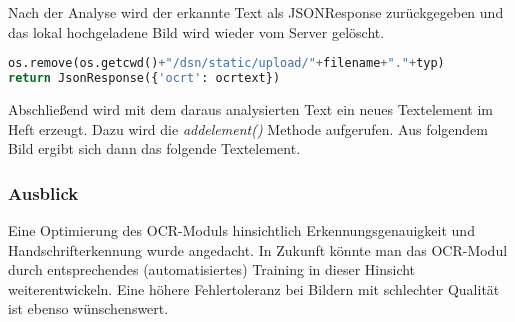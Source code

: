 Nach der Analyse wird der erkannte Text als JSONResponse zurückgegeben und das lokal hochgeladene Bild wird wieder vom Server gelöscht.

\begin{lstlisting}[caption={Fileentfernung und Rückgabe des OCR-Textes}, language=Python]
os.remove(os.getcwd()+"/dsn/static/upload/"+filename+"."+typ)
return JsonResponse({'ocrt': ocrtext})
\end{lstlisting}

Abschließend wird mit dem daraus analysierten Text ein neues Textelement im Heft erzeugt. Dazu wird die \textit{addelement()} Methode aufgerufen. Aus folgendem Bild ergibt sich dann das folgende Textelement.



\subsubsection{Ausblick}
Eine Optimierung des OCR-Moduls hinsichtlich Erkennungsgenauigkeit und Handschrifterkennung wurde angedacht. In Zukunft könnte man das OCR-Modul durch entsprechendes (automatisiertes) Training in dieser Hinsicht weiterentwickeln. Eine höhere Fehlertoleranz bei Bildern mit schlechter Qualität ist ebenso wünschenswert.

